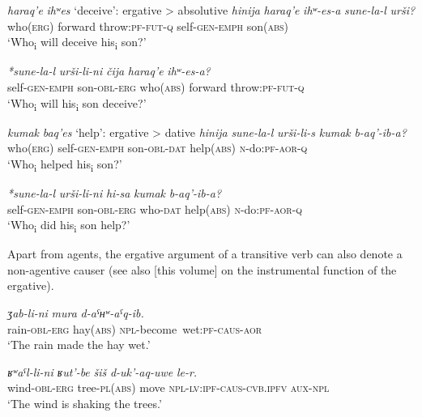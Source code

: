 ﻿\documentclass[output=paper]{langsci/langscibook}
\begin{document}
\ea \label{ex:7:7} %
\emph{haraq'e} \emph{ihʷes} `deceive': ergative \textgreater{} absolutive
\ea %
\gll \emph{hinija} \emph{haraq'e} \emph{ihʷ-es-a} \emph{sune-la-l} \emph{urši?}\\
who(\textsc{erg}) forward throw:\textsc{pf}-\textsc{fut}-\textsc{q} self-\textsc{gen}-\textsc{emph} son(\textsc{abs})\\
\glt `Who\textsubscript{i} will deceive his\textsubscript{i} son?'

\ex %
\gll \emph{*sune-la-l} \emph{urši-li-ni} \emph{čija} \emph{haraq'e} \emph{ihʷ-es-a?}\\
self-\textsc{gen}-\textsc{emph} son-\textsc{obl}-\textsc{erg} who(\textsc{abs}) forward throw:\textsc{pf}-\textsc{fut}-\textsc{q}\\
\glt `Who\textsubscript{i} will his\textsubscript{i} son deceive?'
\z

\ex \label{ex:7:8} %
\emph{kumak} \emph{baq'es} `help': ergative \textgreater{} dative
\ea %
\gll \emph{hinija} \emph{sune-la-l} \emph{urši-li-s} \emph{kumak} \emph{b-aq'-ib-a?}\\
who(\textsc{erg}) self-\textsc{gen}-\textsc{emph} son-\textsc{obl}-\textsc{dat} help(\textsc{abs}) \textsc{n}-do:\textsc{pf}-\textsc{aor}-\textsc{q}\\
\glt `Who\textsubscript{i} helped his\textsubscript{i} son?'

\ex %
\gll \emph{*sune-la-l} \emph{urši-li-ni} \emph{hi-sa} \emph{kumak} \emph{b-aq'-ib-a?}\\
self-\textsc{gen}-\textsc{emph} son-\textsc{obl}-\textsc{erg} who-\textsc{dat} help(\textsc{abs}) \textsc{n}-do:\textsc{pf}-\textsc{aor}-\textsc{q}\\
\glt `Who\textsubscript{i} did his\textsubscript{i} son help?'
\z
\z

Apart from agents, the ergative argument of a transitive verb can also
denote a non-agentive causer (see also \citealt{chechuro2019} [this volume] on the
instrumental function of the ergative).

\ea %
\gll \emph{ʒab-li-ni} \emph{mura} \emph{d-aˤʜʷ-aˤq-ib.}\\
rain-\textsc{obl}-\textsc{erg} hay(\textsc{abs}) \textsc{npl}-become~wet:\textsc{pf}-\textsc{caus}-\textsc{aor}\\
\glt `The rain made the hay wet.'

\ex %
\gll \emph{ʁʷaˤl-li-ni} \emph{ʁut'-be} \emph{šiš} \emph{d-uk'-aq-uwe} \emph{le-r.}\\
wind-\textsc{obl}-\textsc{erg} tree-\textsc{pl}(\textsc{abs}) move \textsc{npl}-\textsc{lv}:\textsc{ipf}-\textsc{caus}-\textsc{cvb.ipfv} \textsc{aux}-\textsc{npl}\\
\glt `The wind is shaking the trees.'
\end{document}
